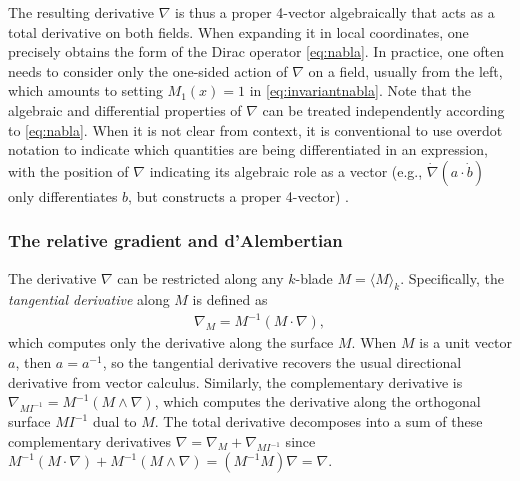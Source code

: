 \documentclass[1p,sort&compress]{elsarticle}
\numberwithin{equation}{section}
\newcommand{\mean}[1]{\langle #1 \rangle}
\begin{document}
The resulting derivative $\nabla$ is thus a proper 4-vector algebraically that acts as a total derivative on both fields.  When expanding it in local coordinates, one precisely obtains the form of the Dirac operator \eqref{eq:nabla}.  In practice, one often needs to consider only the one-sided action of $\nabla$ on a field, usually from the left, which amounts to setting $M_1(x) = 1$ in \eqref{eq:invariantnabla}.  Note that the algebraic and differential properties of $\nabla$ can be treated independently according to \eqref{eq:nabla}.  When it is not clear from context, it is conventional to use overdot notation to indicate which quantities are being differentiated in an expression, with the position of $\nabla$ indicating its algebraic role as a vector (e.g., $\dot{\nabla}(a\cdot\dot{b})$ only differentiates $b$, but constructs a proper 4-vector) \cite{Doran2007}.


\subsubsection{The relative gradient and d'Alembertian}


The derivative $\nabla$ can be restricted along any $k$-blade $M = \mean{M}_k$.  Specifically, the \emph{tangential derivative} along $M$ is defined as 
\begin{align}
  \nabla_{M} = M^{-1} (M \cdot \nabla),
\end{align}
which computes only the derivative along the surface $M$.  When $M$ is a unit vector $a$, then $a = a^{-1}$, so the tangential derivative recovers the usual directional derivative from vector calculus.  Similarly, the complementary derivative is $\nabla_{M I^{-1}} = M^{-1} (M \wedge \nabla)$, which computes the derivative along the orthogonal surface $M I^{-1}$ dual to $M$.  The total derivative decomposes into a sum of these complementary derivatives $\nabla = \nabla_{M} + \nabla_{M I^{-1}}$ since $M^{-1} (M \cdot \nabla) + M^{-1} (M \wedge \nabla) = (M^{-1} M) \nabla = \nabla$.
\end{document}
